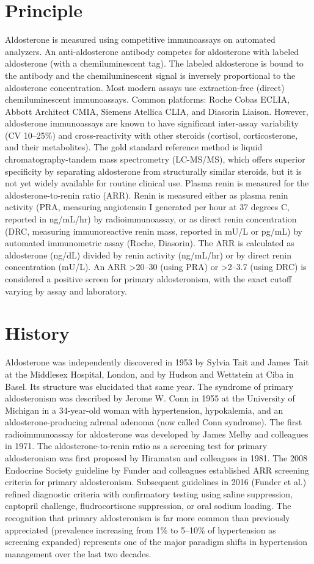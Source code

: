 \section*{Principle}
Aldosterone is measured using competitive immunoassays on automated analyzers. An anti-aldosterone antibody competes for aldosterone with labeled aldosterone (with a chemiluminescent tag). The labeled aldosterone is bound to the antibody and the chemiluminescent signal is inversely proportional to the aldosterone concentration. Most modern assays use extraction-free (direct) chemiluminescent immunoassays. Common platforms: Roche Cobas ECLIA, Abbott Architect CMIA, Siemens Atellica CLIA, and Diasorin Liaison. However, aldosterone immunoassays are known to have significant inter-assay variability (CV 10--25\%) and cross-reactivity with other steroids (cortisol, corticosterone, and their metabolites). The gold standard reference method is liquid chromatography-tandem mass spectrometry (LC-MS/MS), which offers superior specificity by separating aldosterone from structurally similar steroids, but it is not yet widely available for routine clinical use. Plasma renin is measured for the aldosterone-to-renin ratio (ARR). Renin is measured either as plasma renin activity (PRA, measuring angiotensin I generated per hour at 37 degrees C, reported in ng/mL/hr) by radioimmunoassay, or as direct renin concentration (DRC, measuring immunoreactive renin mass, reported in mU/L or pg/mL) by automated immunometric assay (Roche, Diasorin). The ARR is calculated as aldosterone (ng/dL) divided by renin activity (ng/mL/hr) or by direct renin concentration (mU/L). An ARR >20--30 (using PRA) or >2--3.7 (using DRC) is considered a positive screen for primary aldosteronism, with the exact cutoff varying by assay and laboratory.

\section*{History}
Aldosterone was independently discovered in 1953 by Sylvia Tait and James Tait at the Middlesex Hospital, London, and by Hudson and Wettstein at Ciba in Basel. Its structure was elucidated that same year. The syndrome of primary aldosteronism was described by Jerome W. Conn in 1955 at the University of Michigan in a 34-year-old woman with hypertension, hypokalemia, and an aldosterone-producing adrenal adenoma (now called Conn syndrome). The first radioimmunoassay for aldosterone was developed by James Melby and colleagues in 1971. The aldosterone-to-renin ratio as a screening test for primary aldosteronism was first proposed by Hiramatsu and colleagues in 1981. The 2008 Endocrine Society guideline by Funder and colleagues established ARR screening criteria for primary aldosteronism. Subsequent guidelines in 2016 (Funder et al.) refined diagnostic criteria with confirmatory testing using saline suppression, captopril challenge, fludrocortisone suppression, or oral sodium loading. The recognition that primary aldosteronism is far more common than previously appreciated (prevalence increasing from 1\% to 5--10\% of hypertension as screening expanded) represents one of the major paradigm shifts in hypertension management over the last two decades.

